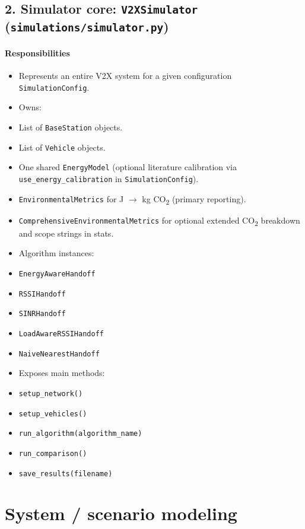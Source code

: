 \documentclass[conference]{IEEEtran}
\begin{document}
\subsection{2. Simulator core: \texttt{V2XSimulator} (\texttt{simulations/simulator.py})}

\paragraph*{Responsibilities}
\begin{itemize}
\item Represents an entire V2X system for a given configuration \texttt{SimulationConfig}.
\item Owns:
\item List of \texttt{BaseStation} objects.
\item List of \texttt{Vehicle} objects.
\item One shared \texttt{EnergyModel} (optional literature calibration via \texttt{use\_energy\_calibration} in \texttt{SimulationConfig}).
\item \texttt{EnvironmentalMetrics} for J $\rightarrow$ kg CO\textsubscript{2} (primary reporting).
\item \texttt{ComprehensiveEnvironmentalMetrics} for optional extended CO\textsubscript{2} breakdown and scope strings in stats.
\item Algorithm instances:
\item \texttt{EnergyAwareHandoff}
\item \texttt{RSSIHandoff}
\item \texttt{SINRHandoff}
\item \texttt{LoadAwareRSSIHandoff}
\item \texttt{NaiveNearestHandoff}
\item Exposes main methods:
\item \texttt{setup\_network()}
\item \texttt{setup\_vehicles()}
\item \texttt{run\_algorithm(algorithm\_name)}
\item \texttt{run\_comparison()}
\item \texttt{save\_results(filename)}
\end{itemize}



\section{System / scenario modeling}
\end{document}
